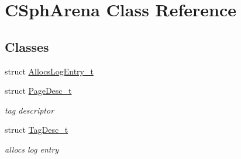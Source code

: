 \hypertarget{classCSphArena}{\section{C\-Sph\-Arena Class Reference}
\label{classCSphArena}
}
\subsection*{Classes}
\begin{DoxyCompactItemize}
\item 
struct \hyperlink{structCSphArena_1_1AllocsLogEntry__t}{Allocs\-Log\-Entry\-\_\-t}
\item 
struct \hyperlink{structCSphArena_1_1PageDesc__t}{Page\-Desc\-\_\-t}
\begin{DoxyCompactList}\small\item\em tag descriptor \end{DoxyCompactList}\item 
struct \hyperlink{structCSphArena_1_1TagDesc__t}{Tag\-Desc\-\_\-t}
\begin{DoxyCompactList}\small\item\em allocs log entry \end{DoxyCompactList}\end{DoxyCompactItemize}
